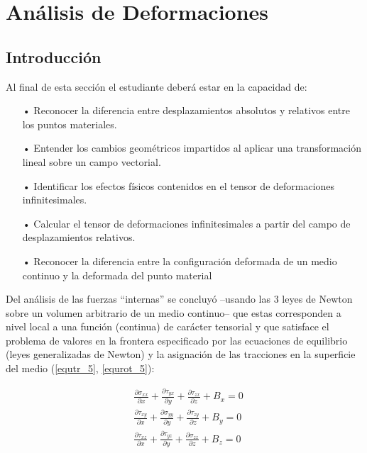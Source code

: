 \documentclass[../notas medios.tex]{subfiles}
\begin{document}
\chapter{Análisis de Deformaciones}

\graphicspath{{img/Cap5/}}
\section{Introducción}

Al final de esta sección el estudiante deberá estar en la capacidad de:

\begin{itemize}
\item[•] Reconocer la diferencia entre desplazamientos absolutos y relativos entre los puntos materiales.
\item[•] Entender los cambios geométricos impartidos al aplicar una transformación lineal sobre un campo vectorial.
\item[•] Identificar los efectos físicos contenidos en el tensor de deformaciones infinitesimales.
\item[•] Calcular el tensor de deformaciones infinitesimales a partir del campo de desplazamientos relativos. 
\item[•] Reconocer la diferencia entre la configuración deformada de un medio continuo y la deformada del punto material
\end{itemize}

Del análisis de las fuerzas ``internas'' se concluyó --usando las 3 leyes de Newton sobre un volumen arbitrario de un medio continuo-- que estas corresponden a nivel local a una función (continua) de carácter tensorial y que satisface el problema de valores en la frontera especificado por las ecuaciones de equilibrio (leyes generalizadas de Newton) y la asignación de las tracciones en la superficie del medio (\cref{equtr_5}, \cref{equrot_5}):

\begin{equation} \label{equtr_5}
\begin{split}
& \frac{\partial \sigma_{xx}}{\partial x} + \frac{\partial \tau_{yx}}{\partial y} + \frac{\partial \tau_{zx}}{\partial z} + B_x = 0 \\
& \frac{\partial \tau_{xy}}{\partial x} + \frac{\partial \sigma_{yy}}{\partial y} + \frac{\partial \tau_{zy}}{\partial z} + B_y = 0 \\
& \frac{\partial \tau_{xz}}{\partial x} + \frac{\partial \tau_{yz}}{\partial y} + \frac{\partial \sigma_{zz}}{\partial z} + B_z = 0 
\end{split}
\end{equation}
\end{document}
